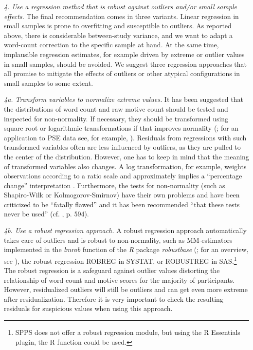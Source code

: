 \documentclass[man,a4paper,mask]{apa6}\usepackage[]{graphicx}\usepackage[]{color}
\begin{document}
\emph{4. Use a regression method that is robust against outliers and/or small sample effects.}
The final recommendation comes in three variants. Linear regression in small samples is prone to overfitting and susceptible to outliers. As reported above, there is considerable between-study variance, and we want to adapt a word-count correction to the specific sample at hand. At the same time, implausible regression estimates, for example driven by extreme or outlier values in small samples, should be avoided. We suggest three regression approaches that all promise to mitigate the effects of outliers or other atypical configurations in small samples to some extent.

\emph{4a. Transform variables to normalize extreme values.} It has been suggested that the distributions of word count and raw motive count should be tested and inspected for non-normality. If necessary, they should be transformed using square root or logarithmic transformations if that improves normality (; for an application to PSE data see, for example, ). Residuals from regressions with such transformed variables often are less influenced by outliers, as they are pulled to the center of the distribution. However, one has to keep in mind that the meaning of transformed variables also changes. A log transformation, for example, weights observations according to a ratio scale and approximately implies a ``percentage change'' interpretation \parencite{keene_LogTransformationSpecial_1995}. Furthermore, the tests for non-normality (such as Shapiro-Wilk or Kolmogorov-Smirnov) have their own problems and have been criticized to be ``fatally flawed'' and it has been recommended ``that these tests never be used'' (cf. , p. 594).

\emph{4b. Use a robust regression approach.}
A robust regression approach automatically takes care of outliers and is robust to non-normality, such as MM-estimators implemented in the \emph{lmrob} function of the \emph{R} package \emph{robustbase} (; for an overview, see ), the robust regression ROBREG in SYSTAT, or ROBUSTREG in SAS.\footnote{SPPS does not offer a robust regression module, but using the R Essentials plugin, the R function could be used.} The robust regression is a safeguard against outlier values distorting the relationship of word count and motive scores for the majority of participants. However, residualized outliers will still be outliers and can get even more extreme after residualization. Therefore it is very important to check the resulting residuals for suspicious values when using this approach.
\end{document}

